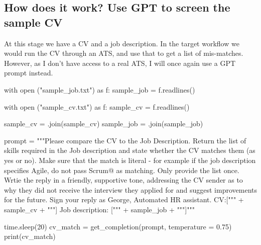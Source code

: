 \documentclass[
  letterpaper,
  DIV=11,
  numbers=noendperiod]{scrartcl}
\newenvironment{Shaded}{\begin{snugshade}}{\end{snugshade}}
\newcommand{\BuiltInTok}[1]{\textcolor[rgb]{0.00,0.23,0.31}{#1}}
\newcommand{\ControlFlowTok}[1]{\textcolor[rgb]{0.00,0.23,0.31}{#1}}
\newcommand{\DecValTok}[1]{\textcolor[rgb]{0.68,0.00,0.00}{#1}}
\newcommand{\FloatTok}[1]{\textcolor[rgb]{0.68,0.00,0.00}{#1}}
\newcommand{\ImportTok}[1]{\textcolor[rgb]{0.00,0.46,0.62}{#1}}
\newcommand{\NormalTok}[1]{\textcolor[rgb]{0.00,0.23,0.31}{#1}}
\newcommand{\OperatorTok}[1]{\textcolor[rgb]{0.37,0.37,0.37}{#1}}
\newcommand{\StringTok}[1]{\textcolor[rgb]{0.13,0.47,0.30}{#1}}
\begin{document}
\hypertarget{how-does-it-work-use-gpt-to-screen-the-sample-cv}{%
\subsection{How does it work? Use GPT to screen the sample
CV}\label{how-does-it-work-use-gpt-to-screen-the-sample-cv}}

At this stage we have a CV and a job description. In the target workflow
we would run the CV through an ATS, and use that to get a list of
mis-matches. However, as I don't have access to a real ATS, I will once
again use a GPT prompt instead.

\begin{Shaded}
\begin{Highlighting}[]
\ControlFlowTok{with} \BuiltInTok{open}\NormalTok{ (}\StringTok{"sample\_job.txt"}\NormalTok{) }\ImportTok{as}\NormalTok{ f:}
\NormalTok{  sample\_job }\OperatorTok{=}\NormalTok{ f.readlines()}

\ControlFlowTok{with} \BuiltInTok{open}\NormalTok{ (}\StringTok{"sample\_cv.txt"}\NormalTok{) }\ImportTok{as}\NormalTok{ f:}
\NormalTok{  sample\_cv }\OperatorTok{=}\NormalTok{ f.readlines()}


\NormalTok{sample\_cv }\OperatorTok{=}\StringTok{\textquotesingle{} \textquotesingle{}}\NormalTok{.join(sample\_cv)}
\NormalTok{sample\_job }\OperatorTok{=}\StringTok{\textquotesingle{} \textquotesingle{}}\NormalTok{.join(sample\_job)}

\NormalTok{prompt }\OperatorTok{=} \StringTok{"""Please compare the CV to the Job Description. Return the list of skills required in the Job description and state whether the CV matches them (as yes or no). Make sure that the match is literal {-} for example if the job description specifies \textquotesingle{}Agile\textquotesingle{}, do not pass \textquotesingle{}Scrum@ as matching. Only provide the list once. Wrtie the reply in a friendly, supportive tone, addressing the CV sender as to why they did not receive the interview they applied for and suggest improvements for the future. Sign your reply as \textquotesingle{}George, Automated HR assistant\textquotesingle{}. CV:["""} \OperatorTok{+}\NormalTok{ sample\_cv }\OperatorTok{+} \StringTok{"""] Job description: ["""} \OperatorTok{+}\NormalTok{ sample\_job }\OperatorTok{+} \StringTok{"""]"""}

\NormalTok{time.sleep(}\DecValTok{20}\NormalTok{)}
\NormalTok{cv\_match }\OperatorTok{=}\NormalTok{ get\_completion(prompt, temperature  }\OperatorTok{=} \FloatTok{0.75}\NormalTok{)}
\BuiltInTok{print}\NormalTok{(cv\_match)}
\end{Highlighting}
\end{Shaded}
\end{document}
